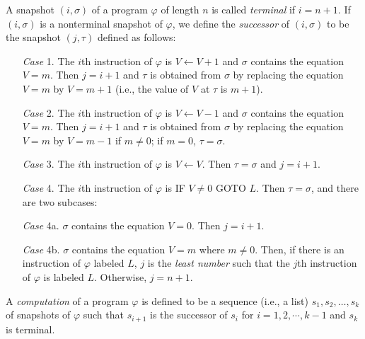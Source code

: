 \documentclass[a4paper,10pt,twoside]{book}
\begin{document}
A snapshot $(i,\sigma)$ of a program $\varphi$ of length $n$ is called \textit{terminal} if $i=n+1$. If $(i,\sigma)$ is a nonterminal snapshot of $\varphi$, we define the \textit{successor} of $(i,\sigma)$ to be the snapshot $(j,\tau)$ defined as follows:
\begin{itemize}
    \item[\textit{Case} 1.] The $i$th instruction of $\varphi$ is $V\leftarrow V+1$ and $\sigma$ contains the equation $V=m$. Then $j=i+1$ and $\tau$ is obtained from $\sigma$ by replacing the equation $V=m$ by $V=m+1$ (i.e., the value of $V$ at $\tau$ is $m+1$).
    \item[\textit{Case} 2.] The $i$th instruction of $\varphi$ is $V\leftarrow V-1$ and $\sigma$ contains the equation $V=m$. Then $j=i+1$ and $\tau$ is obtained from $\sigma$ by replacing the equation $V=m$ by $V=m-1$ if $m\neq 0$; if $m=0$, $\tau=\sigma$.
    \item[\textit{Case} 3.] The $i$th instruction of $\varphi$ is $V\leftarrow V$. Then $\tau=\sigma$ and $j=i+1$.
    \item[\textit{Case} 4.] The $i$th instruction of $\varphi$ is IF $V\neq 0$ GOTO $L$. Then $\tau=\sigma$, and there are two subcases:
    \item[\textit{Case} 4a.] $\sigma$ contains the equation $V=0$. Then $j=i+1$.
    \item[\textit{Case} 4b.] $\sigma$ contains the equation $V=m$ where $m\neq 0$. Then, if there is an instruction of $\varphi$ labeled $L$, $j$ is the \textit{least number} such that the $j$th instruction of $\varphi$ is labeled $L$. Otherwise, $j=n+1$.
\end{itemize}

A \textit{computation} of a program $\varphi$ is defined to be a sequence (i.e., a list) $s_1,s_2,\ldots,s_k$ of snapshots of $\varphi$ such that $s_{i+1}$ is the successor of $s_i$ for $i=1,2,\cdots,k-1$ and $s_k$ is terminal.

\end{document}
